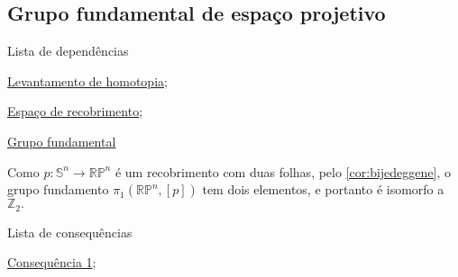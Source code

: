 \subsection{Grupo fundamental de espaço projetivo}
\label{grupo-fundamental-de-espaco-projetivo-ex}
\begin{titlemize}{Lista de dependências}
	\item \hyperref[levantamento-de-homotopia-prop]{Levantamento de homotopia};\\ %
	\item \hyperref[espaco-de-recobrimento-def]{Espaço de recobrimento};\\
    \item \hyperref[grupo-fundamental]{Grupo fundamental}
\end{titlemize}

\begin{ex}
	Como $p:\mathbb{S}^n\rightarrow \mathbb{RP}^n$ é um recobrimento com duas folhas, pelo \ref{cor:bijedeggene}, o grupo fundamento $\pi_1(\mathbb{RP}^n,[p])$ tem dois elementos, e portanto é isomorfo a $\mathbb{Z}_2.$ 
\end{ex}


\begin{titlemize}{Lista de consequências}
	\item \hyperref[consequencia1]{Consequência 1};\\ %
	\item \hyperref[]{}
\end{titlemize}
